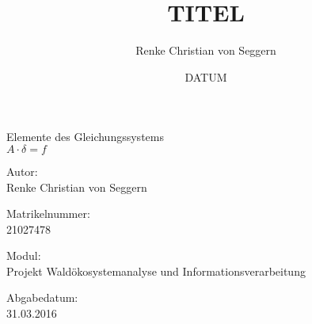 \documentclass[a4paper,12pt] {article}
\title{TITEL}
\author{Renke Christian von Seggern}
\date{DATUM}
\begin{document}
\begin{titlepage}

\begin{center}

\vspace*{0.17\paperheight}

{\LARGE Elemente des Gleichungssystems \\ $A \cdot \delta = f$ \par}

\vspace{0.07\paperheight}

{\large Autor:\\ Renke Christian von Seggern \par}

{\large Matrikelnummer: \\ 21027478 \par}

\vspace{0.07\paperheight}

{\normalsize Modul: \\ Projekt Waldökosystemanalyse und Informationsverarbeitung \par}

\vspace{0.02\paperheight}

{\normalsize Abgabedatum: \\ 31.03.2016 \par}

\vspace{0.02\paperheight}


\end{center}

\end{titlepage}

\newpage



{
\renewcommand{\MakeUppercase}[1]{#1} %


\tableofcontents

}
\end{document}

